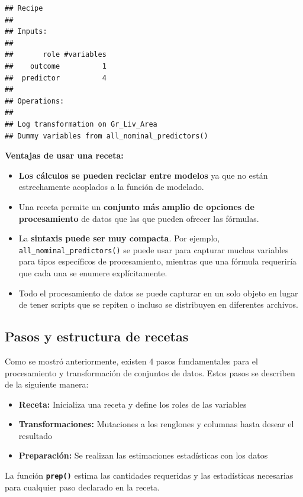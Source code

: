 \documentclass[
]{book}
\begin{document}
\begin{verbatim}
## Recipe
## 
## Inputs:
## 
##       role #variables
##    outcome          1
##  predictor          4
## 
## Operations:
## 
## Log transformation on Gr_Liv_Area
## Dummy variables from all_nominal_predictors()
\end{verbatim}

\textbf{Ventajas de usar una receta:}

\begin{itemize}
\item
  \textbf{Los cálculos se pueden reciclar entre modelos} ya que no están estrechamente acoplados a la función de modelado.
\item
  Una receta permite un \textbf{conjunto más amplio de opciones de procesamiento} de datos que las que pueden ofrecer las fórmulas.
\item
  La \textbf{sintaxis puede ser muy compacta}. Por ejemplo, \texttt{all\_nominal\_predictors()} se puede usar para capturar muchas variables para tipos específicos de procesamiento, mientras que una fórmula requeriría que cada una se enumere explícitamente.
\item
  Todo el procesamiento de datos se puede capturar en un solo objeto en lugar de tener scripts que se repiten o incluso se distribuyen en diferentes archivos.
\end{itemize}

\hypertarget{pasos-y-estructura-de-recetas}{%
\subsection{Pasos y estructura de recetas}\label{pasos-y-estructura-de-recetas}}

Como se mostró anteriormente, existen 4 pasos fundamentales para el procesamiento y transformación de conjuntos de datos. Estos pasos se describen de la siguiente manera:

\begin{itemize}
\item
  \textbf{Receta:} Inicializa una receta y define los roles de las variables
\item
  \textbf{Transformaciones:} Mutaciones a los renglones y columnas hasta desear el resultado
\item
  \textbf{Preparación:} Se realizan las estimaciones estadísticas con los datos
\end{itemize}

La función \textbf{\texttt{prep()}} estima las cantidades requeridas y las estadísticas necesarias para cualquier paso declarado en la receta.
\end{document}
